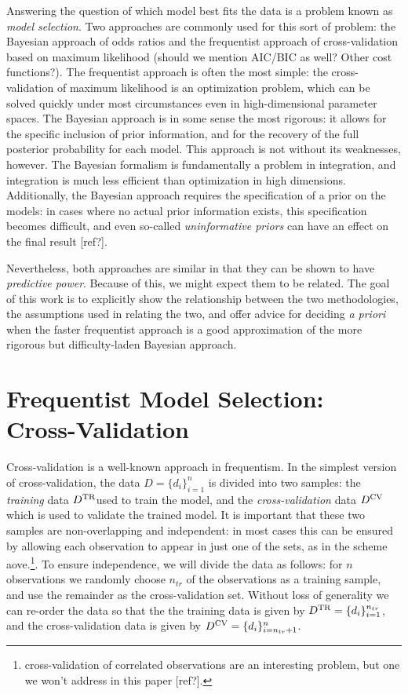 \documentclass[12pt]{article}
\newcommand{\Dtr}{\ensuremath{D^{\rm TR}}}
\newcommand{\Dcv}{\ensuremath{D^{\rm CV}}}
\begin{document}
Answering the question of which model best fits the data is a problem known
as {\it model selection}.  Two approaches are commonly used for this sort
of problem: the Bayesian approach of odds ratios and the frequentist approach
of cross-validation based on maximum likelihood
(should we mention AIC/BIC as well? Other cost functions?).
The frequentist approach is often the most simple: the cross-validation of
maximum likelihood is an optimization problem, which can be solved quickly
under most circumstances even in high-dimensional parameter spaces.
The Bayesian approach is in some sense the most rigorous: it allows for the
specific inclusion of prior information, and for the recovery of the full
posterior probability for each model.  This approach is not without its
weaknesses, however.  The Bayesian formalism is fundamentally a problem in
integration, and integration is much less efficient than optimization in
high dimensions.  Additionally, the Bayesian approach requires the
specification of a prior on the models: in cases where no actual prior
information exists, this specification becomes difficult, and even
so-called {\it uninformative priors} can have an effect on the final
result [ref?].

Nevertheless, both approaches are similar in that they can be shown to
have {\it predictive power}.  Because of this, we might expect them to
be related.  The goal of this work is to explicitly show the relationship
between the two methodologies, the assumptions used in relating the two,
and offer advice for deciding {\it a priori} when the faster frequentist
approach is a good approximation of the more rigorous but difficulty-laden
Bayesian approach.

\section{Frequentist Model Selection: Cross-Validation}
Cross-validation is a well-known approach in frequentism.  In the simplest
version of cross-validation, the data $D = \{d_i\}_{i=1}^n$
is divided into two samples:
the {\it training} data \Dtr used to train the model, and the
{\it cross-validation} data \Dcv which is used to validate the trained
model. It is important that these two samples are
non-overlapping and independent: in most cases this can be ensured by
allowing each observation to appear in just one of the sets, as in the
scheme aove.\footnote{cross-validation of correlated observations are
an interesting problem, but one we won't address in this paper [ref?].}.
To ensure independence, we will divide the data as follows: for $n$
observations we randomly choose $n_{tr}$ of the observations
as a training sample, and use the remainder as the cross-validation set.
Without loss of generality we can re-order the data so that the
the training data is given by $\Dtr = \{d_i\}_{i=1}^{n_{tr}}$,
and the cross-validation data is given by $\Dcv = \{d_i\}_{i=n_{tr}+1}^{n}$.
\end{document}

